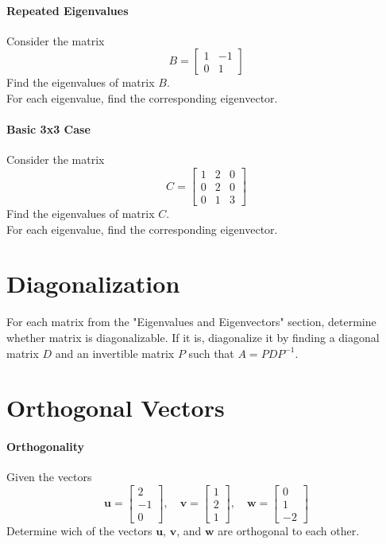 \documentclass[]{article}
\begin{document}
	\paragraph{Repeated Eigenvalues}
	Consider the matrix
	$$B = \begin{bmatrix}
		1 & -1 \\
		0 & 1
	\end{bmatrix}$$
	Find the eigenvalues of matrix $B$.\\
	For each eigenvalue, find the corresponding eigenvector.
	
	\paragraph{Basic 3x3 Case}
	Consider the matrix
	$$C = \begin{bmatrix}
		1 & 2 & 0 \\
		0 & 2 & 0 \\
		0 & 1 & 3
	\end{bmatrix}$$
	Find the eigenvalues of matrix $C$.\\
	For each eigenvalue, find the corresponding eigenvector.
	
	
	\section{Diagonalization}
	For each matrix from the "Eigenvalues and Eigenvectors" section,  determine whether matrix is diagonalizable.
	If it is, diagonalize it by finding a diagonal matrix $D$ and an invertible matrix $P$ such that $A = PDP^{-1}$.
	
	\section{Orthogonal Vectors}
	\paragraph{Orthogonality}
	Given the vectors
	$$
	\mathbf{u} = \begin{bmatrix}
		2 \\
		-1 \\
		0
	\end{bmatrix}, \quad
	\mathbf{v} = \begin{bmatrix}
		1 \\
		2 \\
		1
	\end{bmatrix}, \quad
	\mathbf{w} = \begin{bmatrix}
		0 \\
		1 \\
		-2
	\end{bmatrix}
	$$
	Determine wich of the vectors $\mathbf{u}$, $\mathbf{v}$, and $\mathbf{w}$ are orthogonal to each other.
	
\end{document}
